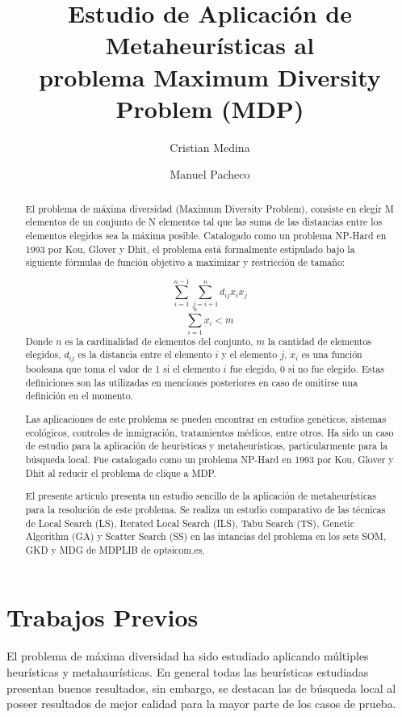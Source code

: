 \documentclass{ci5652}
\title{Estudio de Aplicación de Metaheurísticas al \\ problema Maximum Diversity Problem (MDP)}
\author{Cristian Medina
        \and
        Manuel Pacheco}
\begin{document}
\thispagestyle{empty}
\maketitle


\begin{abstract}
El problema de máxima diversidad (Maximum Diversity Problem), consiste en elegir M elementos de un conjunto de N elementos tal que las suma de las distancias entre los elementos elegidos sea la máxima posible. Catalogado como un problema NP-Hard en 1993 por Kou, Glover y Dhit, el problema está formalmente estipulado bajo la siguiente fórmulas de función objetivo a maximizar y restricción de tamaño:

$$\sum_{i=1}^{n-1} \sum_{j=i+1}^n d_{ij}x_ix_j$$
$$\sum_{i=1}^{n}x_i<m$$ 
Donde $n$ es la cardinalidad de elementos del conjunto, $m$ la cantidad de elementos elegidos, $d_{ij}$ es la distancia entre el elemento $i$ y el elemento $j$, $x_i$ es una función booleana que toma el valor de 1 si el elemento $i$ fue elegido, 0 si no fue elegido. Estas definiciones son las utilizadas en menciones posteriores en caso de omitirse una definición en el momento.
 
Las aplicaciones de este problema se pueden  encontrar en estudios genéticos, sistemas ecológicos, controles de inmigración, tratamientos médicos, entre otros. Ha sido un caso de estudio para la aplicación de heurísticas y metaheurísticas, particularmente para la búsqueda local. Fue catalogado como un problema NP-Hard en 1993 por Kou, Glover y Dhit al reducir el problema de clique a MDP.

El presente artículo presenta un estudio sencillo de la aplicación de metaheurísticas para la resolución de este problema. Se realiza un estudio comparativo de las técnicas de Local Search (LS), Iterated Local Search (ILS), Tabu Search (TS), Genetic Algorithm (GA) y Scatter Search (SS) en las intancias del problema en los sets SOM, GKD y MDG de MDPLIB de optsicom.es.

\end{abstract}

\section{Trabajos Previos}
El problema de máxima diversidad ha sido estudiado aplicando múltiples heurísticas y metahaurísticas. En general todas las heurísticas estudiadas presentan buenos resultados, sin embargo, se destacan las de búsqueda local al poseer resultados de mejor calidad para la mayor parte de los casos de prueba.
\end{document}
